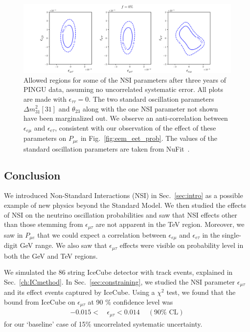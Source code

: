 \documentclass{article}
\newcommand{\emt}{\ensuremath{\epsilon_{\mu\tau}}}
\newcommand{\eet}{\epsilon_{e\tau}}
\newcommand{\eem}{\epsilon_{e\mu}}
\newcommand{\ett}{\ensuremath{\epsilon_{\tau\tau}}}
\newcommand{\dm}{\Delta m^2_{31}}
\newcommand{\Pme}{P_{\mu  e}}
\begin{document}
{{ \begin{figure}
    \includegraphics[scale=0.5]{figures/PINGU_2D_all_f0.pdf}
    \caption{Allowed regions for some of the NSI parameters after three years of PINGU data, assuming no uncorrelated systematic error. All plots are made with $\ett = 0$. The two
    standard oscillation parameters $\dm[31]$ and $\theta_{23}$ along with the one NSI parameter not shown have been marginalized out. We observe an anti-correlation between $\eem$ and $\eet$,
    consistent with our observation of the effect of these parameters on $\Pme$ in  Fig.~\ref{fig:eem_eet_prob}.
    The values of the standard oscillation parameters 
    are taken from NuFit~\cite{nufit}.}\label{fig:PINGU_2D}
 \end{figure}

\subsection{Conclusion}\label{sec:conclusion}
We introduced Non-Standard Interactions (NSI) in Sec.~\ref{sec:intro} as a possible example of new physics beyond the Standard Model.
We then studied the effects of NSI on the neutrino oscillation probabilities and saw that NSI effects other than those stemming from $\emt$ are not apparent in the \si{\TeV} region.
Moreover, we saw in $\Pme$ that we could expect a correlation between $\eem$ and $\eet$ in the single-digit \si{\GeV} range.
We also saw that $\emt$ effects were visible on probability level in both the \si{\GeV} and \si{\TeV} regions.

We simulated the 86 string IceCube detector with track events, explained in Sec.~\ref{ch:ICmethod}.
In Sec.~\ref{sec:constraining}, we studied the NSI parameter $\emt$ and its effect events captured by IceCube. 
Using a $\chi^2$ test, we found that the bound from IceCube on $\emt$ at 90 \% confidence level was 
\begin{align}
    -0.015 <\,& \emt < 0.014\ \quad (90\% \text{ CL})
\end{align}
for our `baseline' case of 15\% uncorrelated systematic uncertainty.

}}
\end{document}
